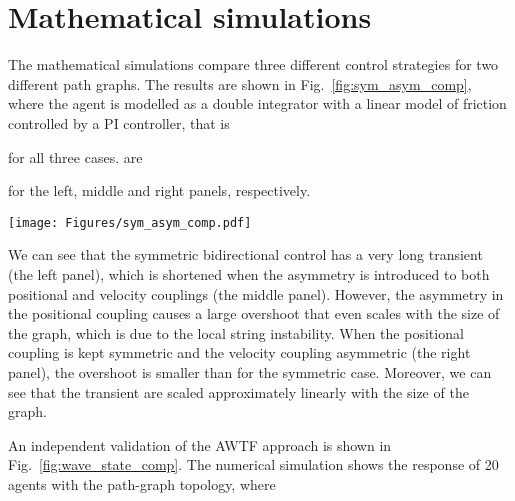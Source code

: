 \documentclass[10pt,twocolumn,twoside]{IEEEtran}
\theoremstyle{definition}
\begin{document}
\section{Mathematical simulations}\label{sec:simulations}




The mathematical simulations compare three different control strategies for two different path graphs. The results are shown in Fig.~\ref{fig:sym_asym_comp}, where the agent is modelled as a double integrator with a linear model of friction controlled by a PI controller, that is

for all three cases.  are

for the left, middle and right panels, respectively.
\setcounter{multi_eq1}{\value{equation}}

\begin{figure*}[ht]
 \centering
  \texttt{[image: Figures/sym\_asym\_comp.pdf]}
  \caption{
The numerical simulations showing the position of the last agent in the distributed system with path-graph topology when the leader changes its position from  to . The figure compares three different bidirectional control strategies: i) the symmetric (the left panels) defined by (a), ii) the traditional asymmetric control with asymmetries in both positional and velocity couplings (the middle panels), see (b), and iii) the combined symmetric positional with asymmetric velocity couplings (the right panels), see (c). The top and bottom panels show the system with 20 and 50 agents, respectively.}
  \label{fig:sym_asym_comp}
\end{figure*}


We can see that the symmetric bidirectional control has a very long transient (the left panel), which is shortened when the asymmetry is introduced to both positional and velocity couplings (the middle panel). However, the asymmetry in the positional coupling causes a large overshoot that even scales with the size of the graph, which is due to the local string instability. When the positional coupling is kept symmetric and the velocity coupling asymmetric (the right panel), the overshoot is smaller than for the symmetric case. Moreover, we can see that the transient are scaled approximately linearly with the size of the graph.



An independent validation of the AWTF approach is shown in Fig.~\ref{fig:wave_state_comp}. The numerical simulation shows the response of 20 agents with the path-graph topology, where
\end{document}
